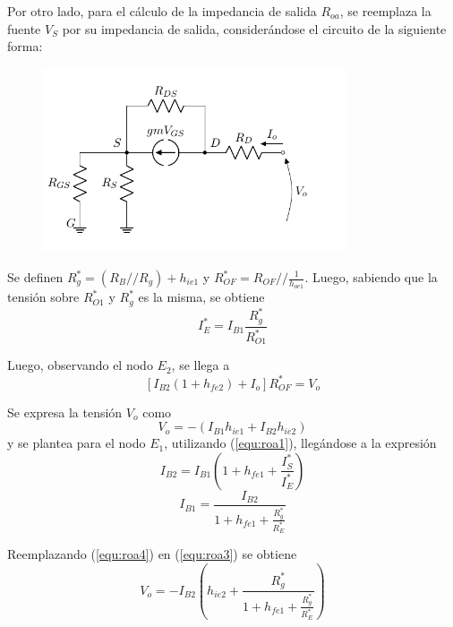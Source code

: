Por otro lado, para el cálculo de la impedancia de salida $R_{oa}$, se reemplaza la fuente $V_S$ por su impedancia de salida, considerándose el circuito de la siguiente forma:
\begin{figure}[H]
\centering
	\includegraphics[width=0.8\textwidth, page=7]{Imagenes/ModeloIncremental.pdf}
\end{figure}
Se definen $R_{g}^{*} = \left( R_B // R_g \right) + h_{ie1}$ y $R_{OF}^* = R_{OF} // \frac{1}{h_{oe1}}$. Luego, sabiendo que la tensión sobre $R_{O1}^{*}$ y $R_{g}^{*}$ es la misma, se obtiene
\begin{equation}
	I_{E}^{*} = I_{B1} \frac{R_{g}^{*}}{R_{O1}^{*}}
	\label{equ:roa1}
\end{equation}

Luego, observando el nodo $E_2$, se llega a
\begin{equation}
	\left[ I_{B2} \left( 1 + h_{fe2} \right) + I_o \right] R_{OF}^* = V_o
	\label{equ:roa2}
\end{equation}

Se expresa la tensión $V_o$ como
\begin{equation}
	V_o = - \left( I_{B1} h_{ie1} + I_{B2} h_{ie2} \right)
	\label{equ:roa3}
\end{equation}
y se plantea para el nodo $E_1$, utilizando (\ref{equ:roa1}), llegándose a la expresión
\begin{equation*}
	I_{B2} = I_{B1} \left( 1 +h_{fe1} + \frac{I_{S}^{*}}{I_{E}^{*}} \right)
\end{equation*}
\begin{equation}
	I_{B1} = \frac{I_{B2}}{1 +h_{fe1} + \frac{R_{g}^{*}}{R_{E}^{*}}}
	\label{equ:roa4}
\end{equation}

Reemplazando (\ref{equ:roa4}) en (\ref{equ:roa3}) se obtiene
\begin{equation}
	V_o = - I_{B2} \left( h_{ie2} + \frac{R_{g}^{*}}{ 1 +h_{fe1} + \frac{R_{g}^{*}}{R_{E}^{*}}} \right)
	\label{equ:roa5}
\end{equation}

